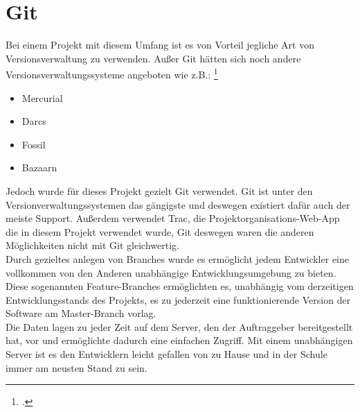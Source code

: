 \section{Git}
\fib{}

\noindent
Bei einem Projekt mit diesem Umfang ist es von Vorteil jegliche Art von Versionsverwaltung zu verwenden. Außer Git hätten sich noch andere Versionsverwaltungssysteme angeboten wie z.B.:
\footcite{noauthor_git_2019}
\begin{itemize}
	\item Mercurial
	\item Darcs
	\item Fossil
	\item Bazaarn	
\end{itemize}

\noindent
Jedoch wurde für dieses Projekt gezielt Git verwendet. Git ist unter den Versionverwaltungssystemen das gängigste und deswegen existiert dafür auch der meiste Support. Außerdem verwendet Trac, die Projektorganisations-Web-App die in diesem Projekt verwendet wurde, Git deswegen waren die anderen Möglichkeiten nicht mit Git gleichwertig. 
\\

\noindent
Durch gezieltes anlegen von Branches wurde es ermöglicht jedem Entwickler eine vollkommen von den Anderen unabhängige Entwicklungsumgebung zu bieten. 
Diese sogenannten Feature-Branches ermöglichten es, unabhängig vom derzeitigen Entwicklungsstands des Projekts, es zu jederzeit eine funktionierende Version der Software am Master-Branch vorlag.
\\

\noindent
Die Daten lagen zu jeder Zeit auf dem Server, den der Auftraggeber bereitgestellt hat, vor und ermöglichte dadurch eine einfachen Zugriff. Mit einem unabhängigen Server ist es den Entwicklern leicht gefallen von zu Hause und in der Schule immer am neusten Stand zu sein.
\\